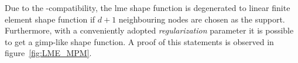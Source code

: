 \documentclass[preprint,12pt,a4paper]{elsarticle}
\begin{document}
Due to the -compatibility, the \acrshort{lme} shape function is degenerated to
linear finite element shape function if $d+1$ neighbouring nodes are
chosen as the support. Furthermore, with a conveniently adopted
\textit{regularization} parameter it is possible to get a \acrshort{gimp}-like
shape function. A proof of this statements is observed in figure~\ref{fig:LME_MPM}.  
\begin{figure}
  \centering
\end{figure}
\end{document}
